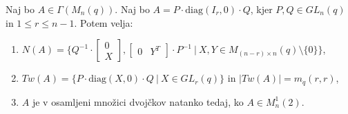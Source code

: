 \documentclass[mat1, tisk]{fmfdelo}
\begin{document}
%
\begin{lema}\label{lema4.4}
  Naj bo $A \in \Gamma(M_n(q))$. Naj bo $A = P \cdot \text{diag}(I_r, 0) \cdot Q$, 
  kjer $P, Q \in GL_n(q)$ in $1 \leq r \leq n-1$. Potem velja:
  \begin{enumerate}[label=({\alph*})]
    \item $N(A) = \{Q^{-1} \cdot 
    \begin{bmatrix}
      0 \\
      X
    \end{bmatrix}, 
    \begin{bmatrix}
      0 & Y^T
    \end{bmatrix} \cdot P^{-1}
    ~|~ X, Y \in M_{(n-r) \times n}(q)\setminus\{0\}\}$,
    \item $Tw(A) = \{P \cdot \text{diag}(X,0) \cdot Q~|~ X \in GL_r(q)\}$ in $|Tw(A)| = m_q(r,r)$,
    \item $A$ je v osamljeni množici dvojčkov natanko tedaj, ko $A \in {M}_n^1(2)$.
  \end{enumerate}
\end{lema}
\end{document}
